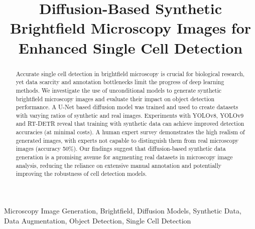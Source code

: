 \documentclass[conference,a4paper]{IEEEtran}
\begin{document}
\title{Diffusion-Based Synthetic Brightfield Microscopy Images for Enhanced Single Cell Detection}

\author{
\and
{}
\and
{}
}

\maketitle

\begin{abstract}
    Accurate single cell detection in brightfield microscopy is crucial for biological research, yet data scarcity and annotation bottlenecks limit the progress of deep learning methods.
    We investigate the use of unconditional models to generate synthetic brightfield microscopy images and evaluate their impact on object detection performance.
    A U-Net based diffusion model was trained and used to create datasets with varying ratios of synthetic and real images.
    Experiments with YOLOv8, YOLOv9 and RT-DETR reveal that training with synthetic data can achieve improved detection accuracies (at minimal costs).
    A human expert survey demonstrates the high realism of generated images, with experts not capable to distinguish them from real microscopy images (accuracy 50\%).
    Our findings suggest that diffusion-based synthetic data generation is a promising avenue for augmenting real datasets in microscopy image analysis, reducing the reliance on extensive manual annotation and potentially improving the robustness of cell detection models.
\end{abstract}

\begin{IEEEkeywords}
Microscopy Image Generation, Brightfield, Diffusion Models, Synthetic Data, Data Augmentation, Object Detection, Single Cell Detection
\end{IEEEkeywords}








{
    \small
    
    
}
\end{document}
